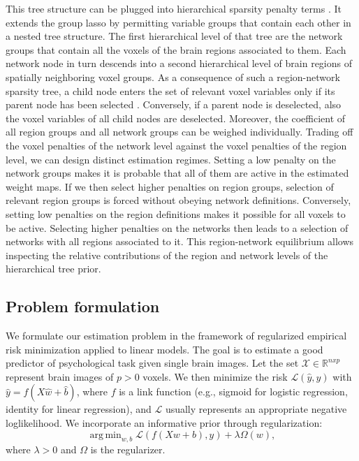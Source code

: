 \documentclass{article}
\DeclareMathOperator*{\argmin}{arg\,min}
\newcommand{\R}{\mathbb{R}}
\begin{document}
This tree structure can be plugged into
hierarchical sparsity penalty terms
\cite{jenatton2011multi}.
It extends the group lasso
\cite{yuan2006model}
by permitting variable groups that contain each other
in a nested tree structure.
The first hierarchical level of that tree are
the network groups that contain all
the voxels of the brain regions associated to them.
Each network node in turn descends into a second hierarchical level of
brain regions of spatially neighboring voxel groups.
%
As a consequence of such a region-network sparsity tree,
a child node enters the set of relevant voxel variables only
if its parent node has been selected
\cite{bach2012optimization}.
Conversely,
if a parent node is deselected,
also the voxel variables of all child nodes are deselected.
%
Moreover,
the coefficient of all region groups and all network groups can
be weighed individually.
Trading off the voxel penalties of the network level against the
voxel penalties of the region level,
we can design distinct estimation regimes.
%
Setting a low penalty on the network groups makes it is probable
that all of them are active in the estimated weight maps. If we then select
higher penalties on region groups, selection of relevant region groups is
forced without obeying network definitions.
Conversely, setting low penalties on the region definitions
makes it possible for
all voxels to be active. Selecting higher penalties on the networks then
leads to a selection of networks with all regions associated to it.
%
This region-network equilibrium allows inspecting the relative contributions
of the region and network levels
of the hierarchical tree prior.


\subsection{Problem formulation}
We formulate our estimation problem in the framework of regularized
empirical risk
minimization applied to linear models.
The goal is to estimate a good predictor of psychological task
given single brain images. Let the set \(\mathcal X\in\R^{nxp}\) represent brain
images of \(p > 0\) voxels.
%
We then minimize the risk \(\mathcal L(\hat y, y)\) with
\(\hat y = f(X\hat w + \hat b)\), where \(f\) is a link function 
(e.g., sigmoid for logistic regression, identity for linear regression),
and \(\mathcal L\) usually represents an appropriate negative loglikelihood.
We incorporate an informative prior through regularization:
\[\argmin_{w, b} \mathcal L(f(Xw + b), y) + \lambda\Omega(w),\]
where \(\lambda > 0\) and \(\Omega\) is the regularizer.
\end{document}
